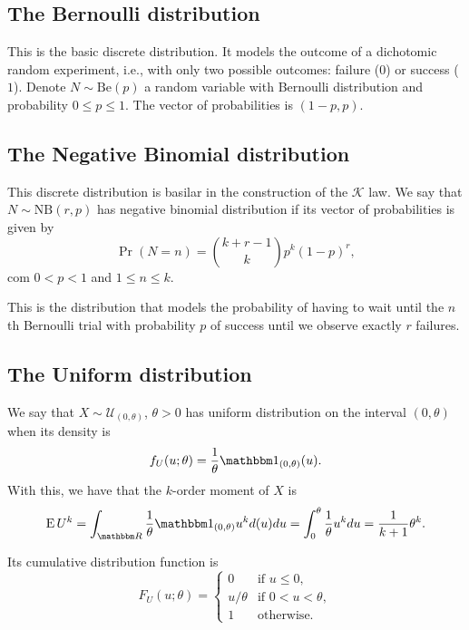 \subsection{The Bernoulli distribution}\label{Sec:Bernoulli}

This is the basic discrete distribution.
It models the outcome of a dichotomic random experiment, i.e., with only two possible outcomes: failure ($0$) or success ($1$).
Denote $N\sim\text{Be}(p)$ a random variable with Bernoulli distribution and probability $0\leq p\leq 1$.
The vector of probabilities is $(1-p,p)$.

\subsection{The Negative Binomial distribution}\label{Sec:NegativeBinomial}

This discrete distribution is basilar in the construction of the $\mathcal K$ law.
We say that $N\sim\text{NB}(r,p)$ has negative binomial distribution if its vector of probabilities is given by
$$
\Pr(N=n) = {{k+r-1}\choose{k}} p^k (1-p)^r,
$$
com $0<p<1$ and $1\leq n\leq k$.

This is the distribution that models the probability of having to wait until the $n$th Bernoulli trial with probability $p$ of success until we observe exactly $r$ failures.

\subsection{The Uniform distribution}\label{Sec:UnifDistribution}

We say that $X\sim\mathcal U_{(0,\theta)}$, $\theta>0$ has uniform distribution on the interval $(0,\theta)$ when its density is
\begin{equation}
f_U(u;\theta) = \frac{1}{\theta} \mathbbm 1_{(0,\theta)} (u).
\label{eq:DensUniform}
\end{equation}
With this, we have that the $k$-order moment of $X$ is
\begin{equation}
\operatorname{E}U^k = \int_{\mathbbm R}\frac{1}{\theta} \mathbbm 1_{(0,\theta)} u^k d(u) du = 
\int_{0}^{\theta} \frac1\theta u^k du = 
\frac{1}{k+1} \theta^k.
\label{eq:MomentsUniform}
\end{equation}

Its cumulative distribution function is
\begin{equation}
F_U(u;\theta) = 
	\begin{cases}
	0 				& \text{if } u\leq 0,\\
	u/\theta 	& \text{if } 0< u < \theta,\\
	1 				& \text{otherwise.}
	\end{cases}
\label{eq:CDFUniform}
\end{equation}

